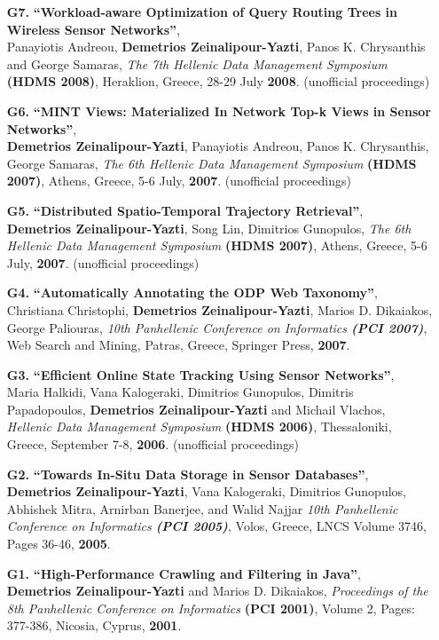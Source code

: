 \documentclass[10pt]{article}
\begin{document}
\begin{enumerate}
\item [{\bf G7.}]
\label{G7}
{\bf ``Workload-aware Optimization of Query Routing Trees in Wireless Sensor Networks''}, \\
Panayiotis Andreou, {\bf Demetrios Zeinalipour-Yazti}, Panos K. Chrysanthis and George Samaras,
{\em The 7th Hellenic Data Management Symposium} {\bf (HDMS 2008)}, 
Heraklion, Greece, 28-29 July {\bf 2008}. (unofficial proceedings)

\item [{\bf G6.}]
\label{G6}  
{\bf ``MINT Views: Materialized In Network Top-k Views in Sensor Networks''}, \\
{\bf Demetrios Zeinalipour-Yazti}, Panayiotis Andreou, Panos K. Chrysanthis, George Samaras, 
{\em The 6th Hellenic Data Management Symposium} {\bf (HDMS 2007)}, 
Athens, Greece, 5-6 July, {\bf 2007}. (unofficial proceedings)

\item [{\bf G5.}]
\label{G5}  
{\bf ``Distributed Spatio-Temporal Trajectory Retrieval''}, \\
{\bf Demetrios Zeinalipour-Yazti}, Song Lin, Dimitrios Gunopulos, 
{\em The 6th Hellenic Data Management Symposium} {\bf (HDMS 2007)}, 
Athens, Greece, 5-6 July, {\bf 2007}. (unofficial proceedings)

\item [{\bf G4.}]
\label{G4}
{\bf ``Automatically Annotating the ODP Web Taxonomy''},\\
Christiana Christophi, {\bf Demetrios Zeinalipour-Yazti}, Marios D. Dikaiakos, George Paliouras,
{\em 10th Panhellenic Conference on Informatics {\bf (PCI 2007)}}, Web Search and Mining,
Patras, Greece, Springer Press, {\bf 2007}. 

\item [{\bf G3.}]
\label{G3}
{\bf ``Efficient Online State Tracking Using Sensor Networks''}, \\
Maria Halkidi, Vana Kalogeraki, Dimitrios Gunopulos, Dimitris Papadopoulos, {\bf Demetrios Zeinalipour-Yazti} and Michail Vlachos,
{\em Hellenic Data Management Symposium} {\bf (HDMS 2006)},
Thessaloniki, Greece, September 7-8,  {\bf 2006}.  (unofficial proceedings)

\item [{\bf G2.}]
\label{G2}  
{\bf ``Towards In-Situ Data Storage in Sensor Databases''}, \\
{\bf Demetrios Zeinalipour-Yazti}, Vana Kalogeraki, Dimitrios Gunopulos, Abhishek Mitra, Arnirban Banerjee, and Walid Najjar
{\em 10th Panhellenic Conference on Informatics {\bf (PCI 2005)}},
Volos, Greece, LNCS Volume 3746, Pages 36-46, {\bf 2005}.

\item [{\bf G1.}]
\label{G1}
{\bf ``High-Performance Crawling and Filtering in Java''},\\
{\bf Demetrios Zeinalipour-Yazti} and Marios D. Dikaiakos, 
{\em Proceedings of the 8th Panhellenic Conference on Informatics} {\bf (PCI 2001)},
Volume 2, Pages: 377-386, Nicosia, Cyprus, {\bf 2001}.

\end{enumerate}
\end{document}

